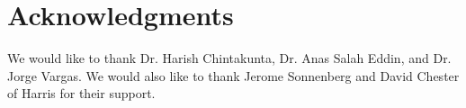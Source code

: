 \section{Acknowledgments}

We would like to thank Dr. Harish Chintakunta, Dr. Anas Salah Eddin, and Dr. Jorge Vargas. We would also like to thank Jerome Sonnenberg and David Chester of Harris for their support. 
